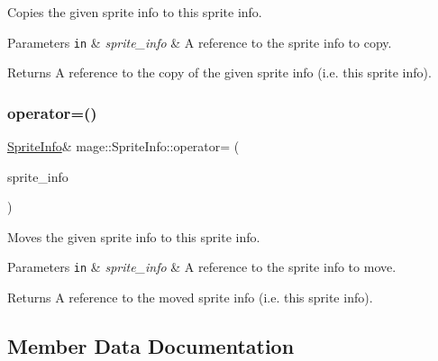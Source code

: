 Copies the given sprite info to this sprite info.


\begin{DoxyParams}[1]{Parameters}
\mbox{\tt in}  & {\em sprite\+\_\+info} & A reference to the sprite info to copy. \\
\hline
\end{DoxyParams}
\begin{DoxyReturn}{Returns}
A reference to the copy of the given sprite info (i.\+e. this sprite info). 
\end{DoxyReturn}
\hypertarget{structmage_1_1_sprite_info_ae504d8d63f6cabd0f9c9c28833bb9366}{}\label{structmage_1_1_sprite_info_ae504d8d63f6cabd0f9c9c28833bb9366} 
\subsubsection{\texorpdfstring{operator=()}{operator=()}\hspace{0.1cm}{\footnotesize\ttfamily [2/2]}}
{\footnotesize\ttfamily \hyperlink{structmage_1_1_sprite_info}{Sprite\+Info}\& mage\+::\+Sprite\+Info\+::operator= (\begin{DoxyParamCaption}\item[{\hyperlink{structmage_1_1_sprite_info}{Sprite\+Info} \&\&}]{sprite\+\_\+info }\end{DoxyParamCaption})\hspace{0.3cm}{\ttfamily [default]}}

Moves the given sprite info to this sprite info.


\begin{DoxyParams}[1]{Parameters}
\mbox{\tt in}  & {\em sprite\+\_\+info} & A reference to the sprite info to move. \\
\hline
\end{DoxyParams}
\begin{DoxyReturn}{Returns}
A reference to the moved sprite info (i.\+e. this sprite info). 
\end{DoxyReturn}


\subsection{Member Data Documentation}
\hypertarget{structmage_1_1_sprite_info_a68b91ee8a489cd605aa208b6a1e54d62}{}\label{structmage_1_1_sprite_info_a68b91ee8a489cd605aa208b6a1e54d62} 
